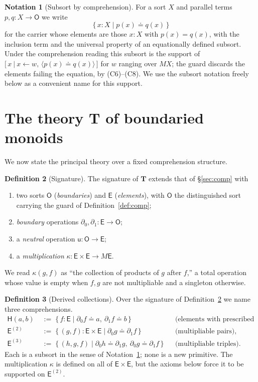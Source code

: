 \documentclass[11pt]{article}
\theoremstyle{definition}
\newtheorem{definition}{Definition}[section]
\newtheorem{notation}[definition]{Notation}
\theoremstyle{plain}
\newcommand{\Ob}{\mathsf{O}}            %
\newcommand{\Ed}{\mathsf{E}}            %
\newcommand{\M}{M}                      %
\newcommand{\guard}[1]{\langle #1\rangle}
\newcommand{\eq}{\mathrel{\doteq}}      %
\newcommand{\gen}[2]{#1\!\leftarrow\!#2}%
\newcommand{\dl}{\partial_{0}}          %
\newcommand{\dr}{\partial_{1}}          %
\newcommand{\uu}{\mathsf{u}}            %
\newcommand{\kk}{\kappa}                %
\newcommand{\Hom}{\mathsf{H}}           %
\newcommand{\compr}[2]{\bigl[\,#1 \ \big|\ #2\,\bigr]}
\begin{document}
\begin{notation}[Subsort by comprehension]\label{not:subsort}
For a sort $X$ and parallel terms $p,q\colon X\to\Ob$ we write
\[
  \{\,x\colon X \mid p(x)\eq q(x)\,\}
\]
for the carrier whose elements are those $x\colon X$ with $p(x)=q(x)$, with the
inclusion term and the universal property of an equationally defined subsort.
Under the comprehension reading this subsort is the support of
$\compr{x}{\gen{x}{w},\,\guard{p(x)\eq q(x)}}$ for $w$ ranging over $\M X$; the
guard discards the elements failing the equation, by (C6)--(C8). We use the
subsort notation freely below as a convenient name for this support.
\end{notation}

\section{The theory \texorpdfstring{$\mathbf{T}$}{T} of boundaried monoids}
\label{sec:T}

We now state the principal theory over a fixed comprehension structure.

\begin{definition}[Signature]\label{def:sig}
The signature of $\mathbf{T}$ extends that of \S\ref{sec:comp} with
\begin{enumerate}[label=(\roman*)]
  \item two sorts $\Ob$ (\emph{boundaries}) and $\Ed$ (\emph{elements}), with
        $\Ob$ the distinguished sort carrying the guard of
        Definition~\ref{def:comp};
  \item \emph{boundary} operations $\dl,\dr\colon\Ed\to\Ob$;
  \item a \emph{neutral} operation $\uu\colon\Ob\to\Ed$;
  \item a \emph{multiplication}
        $\kk\colon\Ed\times\Ed\to\M\Ed$.
\end{enumerate}
We read $\kk(g,f)$ as ``the collection of products of $g$ after $f$,'' a total
operation whose value is empty when $f,g$ are not multipliable and a singleton
otherwise.
\end{definition}

\begin{definition}[Derived collections]\label{def:derived}
Over the signature of Definition~\ref{def:sig} we name three comprehensions.
\begin{align*}
  \Hom(a,b) &\;:=\; \{\,f\colon\Ed \mid \dl f\eq a,\ \dr f\eq b\,\}
            &&\text{(elements with prescribed boundaries),}\\
  \Ed^{(2)} &\;:=\; \{\,(g,f)\colon\Ed\times\Ed \mid \dl g\eq \dr f\,\}
            &&\text{(multipliable pairs),}\\
  \Ed^{(3)} &\;:=\; \{\,(h,g,f) \mid \dl h\eq\dr g,\ \dl g\eq\dr f\,\}
            &&\text{(multipliable triples).}
\end{align*}
Each is a subsort in the sense of Notation~\ref{not:subsort}; none is a new
primitive. The multiplication $\kk$ is defined on all of $\Ed\times\Ed$, but the
axioms below force it to be supported on $\Ed^{(2)}$.
\end{definition}
\end{document}
